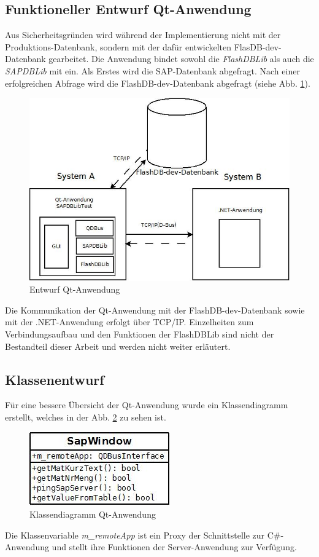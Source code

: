 \subsection{Funktioneller Entwurf Qt-Anwendung}
Aus Sicherheitsgründen wird während der Implementierung nicht mit der Produktions-Datenbank, sondern mit der dafür entwickelten FlasDB-dev-Datenbank gearbeitet.
Die Anwendung bindet sowohl die \textit{FlashDBLib} als auch die \textit{SAPDBLib} mit ein. Als Erstes wird die SAP-Datenbank abgefragt. Nach einer erfolgreichen Abfrage wird die FlashDB-dev-Datenbank abgefragt (siehe Abb. \ref{fig:EntwurfQtAnwendung}). 
\begin{figure}[H]
\centering
\includegraphics[width=0.9\linewidth]{images/EntwurfQtAnwendung}
\caption[Entwurf Qt-Anwendung]{Entwurf Qt-Anwendung}
\label{fig:EntwurfQtAnwendung}
\end{figure}
Die Kommunikation der Qt-Anwendung mit der FlashDB-dev-Datenbank sowie mit der .NET-Anwendung erfolgt über TCP/IP. Einzelheiten zum Verbindungsaufbau und den Funktionen der FlashDBLib sind nicht der Bestandteil dieser Arbeit und werden nicht weiter erläutert.\\ 
\subsection{Klassenentwurf}
Für eine bessere Übersicht der Qt-Anwendung wurde ein Klassendiagramm erstellt, welches in der Abb. \ref{fig:KlassendiagrammQtEntwurf} zu sehen ist.
\begin{figure}[H]
\centering
\includegraphics[width=0.4\linewidth]{images/KlassendiagrammQtEntwurf}
\caption[Klassendiagramm Qt-Anwendung]{Klassendiagramm Qt-Anwendung}
\label{fig:KlassendiagrammQtEntwurf}
\end{figure}
Die Klassenvariable \textit{m\_remoteApp} ist ein Proxy der Schnittstelle zur C\#-Anwendung und stellt ihre Funktionen der Server-Anwendung zur Verfügung.

